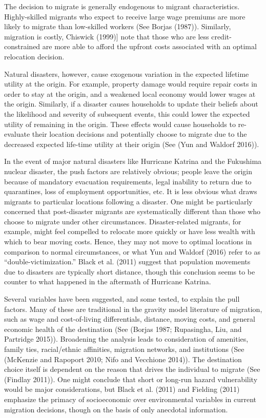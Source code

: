 \documentclass[]{article}
\begin{document}
The decision to migrate is generally endogenous to migrant
characteristics. Highly-skilled migrants who expect to receive large
wage premiums are more likely to migrate than low-skilled workers (See
Borjas (1987)). Similarly, migration is costly, Chiswick (1999){]} note
that those who are less credit-constrained are more able to afford the
upfront costs associated with an optimal relocation decision.

Natural disasters, however, cause exogenous variation in the expected
lifetime utility at the origin. For example, property damage would
require repair costs in order to stay at the origin, and a weakened
local economy would lower wages at the origin. Similarly, if a disaster
causes households to update their beliefs about the likelihood and
severity of subsequent events, this could lower the expected utility of
remaining in the origin. These effects would cause households to
re-evaluate their location decisions and potentially choose to migrate
due to the decreased expected life-time utility at their origin (See
(Yun and Waldorf 2016)).

In the event of major natural disasters like Hurricane Katrina and the
Fukushima nuclear disaster, the push factors are relatively obvious;
people leave the origin because of mandatory evacuation requirements,
legal inability to return due to quarantines, loss of employment
opportunities, etc. It is less obvious what draws migrants to particular
locations following a disaster. One might be particularly concerned that
post-disaster migrants are systematically different than those who
choose to migrate under other circumstances. Disaster-related migrants,
for example, might feel compelled to relocate more quickly or have less
wealth with which to bear moving costs. Hence, they may not move to
optimal locations in comparison to normal circumstances, or what Yun and
Waldorf (2016) refer to as ``double-victimization.'' Black et al. (2011)
suggest that population movements due to disasters are typically short
distance, though this conclusion seems to be counter to what happened in
the aftermath of Hurricane Katrina.

Several variables have been suggested, and some tested, to explain the
pull factors. Many of these are traditional in the gravity model
literature of migration, such as wage and cost-of-living differentials,
distance, moving costs, and general economic health of the destination
(See (Borjas 1987; Rupasingha, Liu, and Partridge 2015)). Broadening the
analysis leads to consideration of amenities, family ties, racial/ethnic
affinities, migration networks, and institutions (See (McKenzie and
Rapoport 2010; Nifo and Vecchione 2014)). The destination choice itself
is dependent on the reason that drives the individual to migrate (See
(Findlay 2011)). One might conclude that short or long-run hazard
vulnerability would be major considerations, but Black et al. (2011) and
Fielding (2011) emphasize the primacy of socioeconomic over
environmental variables in current migration decisions, though on the
basis of only anecdotal information.
\end{document}
